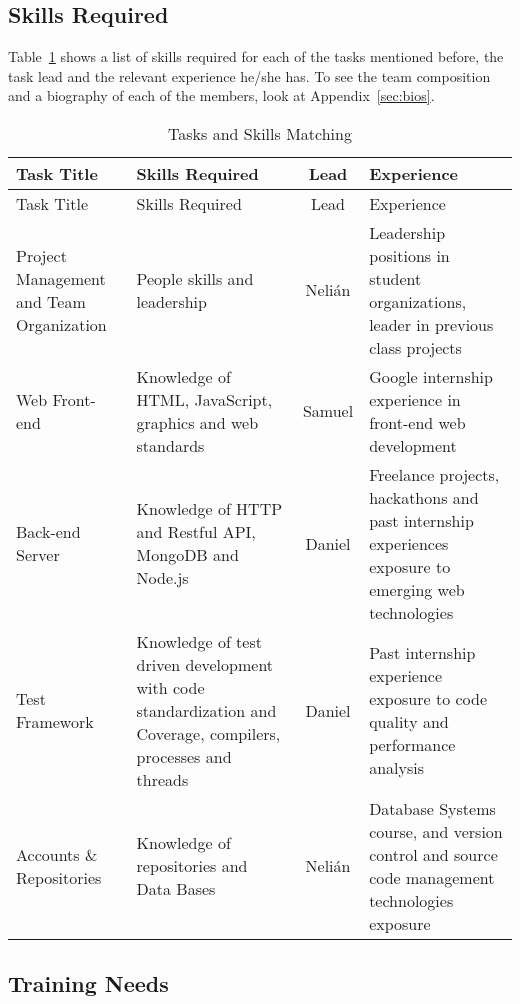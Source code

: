 
\subsection{Skills Required}

Table~\ref{skills} shows a list of skills required for each of the tasks
mentioned before, the task lead and the relevant experience he/she has. To see
the team composition and a biography of each of the members, look at
Appendix~\ref{sec:bios}.

\setlength{\extrarowheight}{1.5pt}
  \begin{longtable}{|m{3cm}|m{4.5cm}|c|m{5cm}|}
 \caption{Tasks and Skills Matching \label{skills}} \\
   \hline
  
  \centering Task Title & Skills Required & Lead & Experience \\
  \hline \hline \endfirsthead
  
     \hline

	\centering Task Title & Skills Required & Lead & Experience \\  
	\hline \hline \endhead
  
  \endfoot  
  
  Project Management and Team Organization & People skills and leadership &
Nelián & Leadership positions in student organizations, leader in previous class
projects\\ \hline   Web Front-end & Knowledge of HTML, JavaScript, graphics and
web standards & Samuel & Google internship experience in front-end web
development\\ \hline   Back-end Server & Knowledge of HTTP and Restful API,
MongoDB and Node.js & Daniel & Freelance projects, hackathons and past
internship experiences exposure to emerging web technologies \\ \hline   Test
Framework & Knowledge of test driven development with code standardization and
Coverage, compilers, processes and threads & Daniel & Past internship experience
exposure to code quality and performance analysis\\ \hline   Accounts \&
Repositories & Knowledge of repositories and Data Bases & Nelián & Database
Systems course, and version control and source code management technologies
exposure\\ \hline    
\end{longtable}

\subsection{Training Needs}


